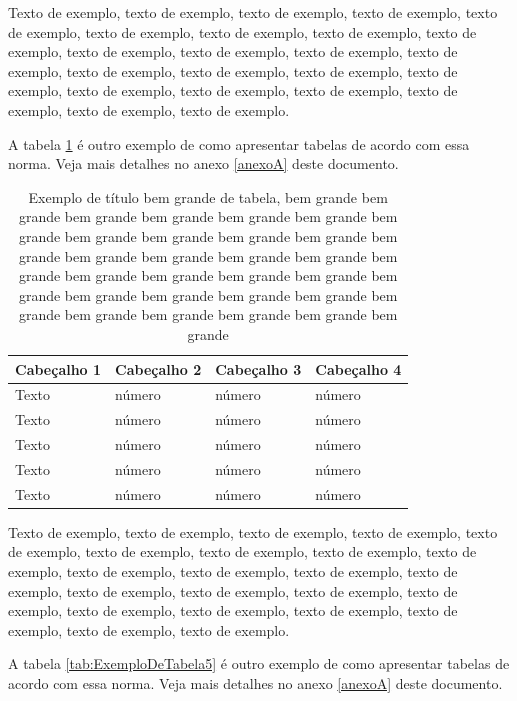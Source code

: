 \documentclass[
	12pt,				%
	oneside,			%
	a4paper,			%
	english,			%
	brazil				%
	]{abntex2ppgsi}
\begin{document}
Texto de exemplo, texto de exemplo, texto de exemplo, texto de exemplo, texto de exemplo, texto de exemplo, texto de exemplo, texto de exemplo, texto de exemplo, texto de exemplo, texto de exemplo, texto de exemplo, texto de exemplo, texto de exemplo, texto de exemplo, texto de exemplo, texto de exemplo, texto de exemplo, texto de exemplo, texto de exemplo, texto de exemplo, texto de exemplo, texto de exemplo.

A tabela \ref{tab:ExemploDeTabela4} é outro exemplo de como apresentar tabelas de acordo com essa norma. Veja mais detalhes no anexo \ref{anexoA} deste documento.

\begin{table}[htbp]
	\centering
	\caption{Exemplo de título bem grande de tabela, bem grande bem grande bem grande bem grande bem grande bem grande bem grande bem grande bem grande bem grande bem grande bem grande bem grande bem grande bem grande bem grande bem grande bem grande bem grande bem grande bem grande bem grande bem grande bem grande bem grande bem grande bem grande bem grande bem grande bem grande bem grande bem grande}
		\begin{tabular}{p{1.4in} p{1.4in} p{1.4in} p{1.4in} } \hline
		
		Cabeçalho 1	& Cabeçalho 2	& Cabeçalho 3	& Cabeçalho 4 \\ \hline
		Texto	& número & número	& número \\ 
		Texto	& número & número	& número \\ 
		Texto	& número & número	& número \\ 
		Texto	& número & número	& número \\ 
		Texto	& número & número	& número \\ \hline
			
		\end{tabular}
	\label{tab:ExemploDeTabela4}
\end{table}

Texto de exemplo, texto de exemplo, texto de exemplo, texto de exemplo, texto de exemplo, texto de exemplo, texto de exemplo, texto de exemplo, texto de exemplo, texto de exemplo, texto de exemplo, texto de exemplo, texto de exemplo, texto de exemplo, texto de exemplo, texto de exemplo, texto de exemplo, texto de exemplo, texto de exemplo, texto de exemplo, texto de exemplo, texto de exemplo, texto de exemplo.

A tabela \ref{tab:ExemploDeTabela5} é outro exemplo de como apresentar tabelas de acordo com essa norma. Veja mais detalhes no anexo \ref{anexoA} deste documento.
\end{document}
